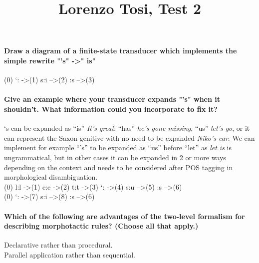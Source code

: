 \documentclass{report}
\title{Lorenzo Tosi, Test 2}
\begin{document}
\maketitle
\paragraph{Draw a diagram of a finite-state transducer which implements the simple rewrite "'s" -\textgreater " is"}
(0) ‘: -\textgreater (1) s:i –\textgreater (2) \textepsilon:s –\textgreater (3)
\paragraph{Give an example where your transducer expands "'s" when it shouldn't. What information could you incorporate to fix it?}
‘s can be expanded as “is” \textit{It’s great}, “has”\textit{ he’s gone missing}, “us” \textit{let’s go}, or it can represent the Saxon genitive with no need to be expanded \textit{Niko’s car}. We can implement for example “’s” to be expanded as “us” before “let” as \textit{let is} is ungrammatical, but in other cases it can be expanded in 2 or more ways depending on the context and needs to be considered after POS tagging in morphological disambiguation. \\
(0) l:l -\textgreater (1) e:e -\textgreater (2) t:t -\textgreater (3) ‘: -\textgreater (4) s:u –\textgreater (5) \textepsilon:s –\textgreater (6) \\
(0) ‘: -\textgreater (7) s:i –\textgreater (8) \textepsilon:s –\textgreater (6)
\paragraph{Which of the following are advantages of the two-level formalism for describing morphotactic rules? (Choose all that apply.)}
Declarative rather than procedural. \\ 
Parallel application rather than sequential.
\end{document}
